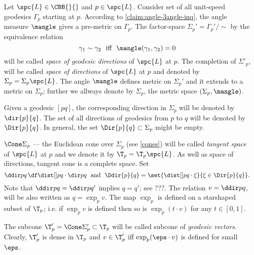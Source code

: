 Let $\spc{L}\in \CBB{}{}$ and $p\in \spc{L}$.
Consider set of all unit-speed geodesics $\Gamma_p$ starting at $p$.
According to \ref{claim:angle-3angle-inq}, the angle measure $\mangle$ gives a pre-metric on $\Gamma_p$.
The factor-space $\Sigma_p'=\Gamma_p'/\sim$ by the equivalence relation 
\[\gamma_1\sim\gamma_2\ \ \text{iff}\ \ \mangle(\gamma_1,\gamma_2)=0\] 
will be called \emph{space of geodesic directions} of $\spc{L}$ at $p$.
The completion of $\Sigma'_p$, will be called \emph{space of directions} of $\spc{L}$ at $p$ and denoted by $\Sigma_p=\Sigma_p \spc{L}$\index{$\Sigma_{*}$}.
The angle $\mangle$ defines metric on $\Sigma_p'$ and it extends to a metric on $\Sigma_p$; further we allways denote by $\Sigma_p$, the metric space $(\Sigma_p,\mangle)$.

Given a geodesic $[p q]$, the corresponding direction in $\Sigma_p$ will be denoted by $\dir{p}{q}$\index{$\dir{*}{*}$}.
The set of all directions of geodesics from $p$ to $q$ will be denoted by $\Dir{p}{q}$\index{$\Dir{{*}}{{*}}$}.
In general, the set $\Dir{p}{q}\subset\Sigma_p$ might be empty.

 $\Cone\Sigma_p$ --- the Euclidean cone over $\Sigma_p$ (see \ref{cones}) will be called \emph{tangent space} of $\spc{L}$ at $p$ and we denote it by $\T_p=\T_p \spc{L}$\index{$\T_{*}$}.
As well as space of directions, tangent cone is a complete space.
Set \index{$\ddir{*}{*}$}\index{$\ddir{*}{*}$}
\[\ddir p q\,
\df
\dist[{{}}]{p}{q}{}\cdot\dir p q
\ \ \hbox{and} \ \ 
\Ddir{p}{q}
=
\set{\dist[{{}}]{p}{q}{}\cdot\xi}{\xi\in\Dir{p}{q}}
.\]
Note that $\ddir p q=\ddir p{q'}$ implies $q=q'$; see ???.
The relation $v=\ddir p q$, will be also written as $q=\exp_p v$.
The map $\exp_p$ is defined on a starshaped subset of $\T_p$; 
i.e. if $\exp_pv$ is defined then so is $\exp_p(t\cdot v)$ for any $t\in[0,1]$. 

The subcone $\T_p'=\Cone\Sigma_p'\subset \T_p$ will be called subcone of \emph{geodesic vectors}.
Clearly, $\T_p'$ is dense in $\T_p$ and $v\in \T_p'$ iff $\exp_p(\eps\cdot v)$ is defined for small $\eps$.
















